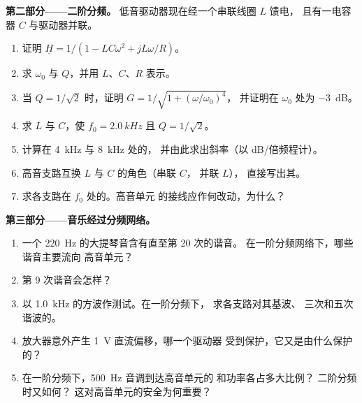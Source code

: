 \begin{problem}
\medskip
\noindent\textbf{第二部分——二阶分频。}
低音驱动器现在经一个串联线圈 $L$ 馈电，
且有一电容器 $C$ 与驱动器并联。
\begin{enumerate}[resume]
  \item 证明 $\underline H = 1/(1 - LC\omega^2 + jL\omega/R)$。
  \item 求 $\omega_0$ 与 $Q$，并用 $L$、$C$、$R$ 表示。
  \item 当 $Q = 1/\sqrt2$ 时，证明 $G = 1/\sqrt{1 + (\omega/\omega_0)^4}$，
        并证明在 $\omega_0$ 处为 \qty{-3}{dB}。
  \item 求 $L$ 与 $C$，使 $f_0 = \qty{2.0}{kHz}$ 且 $Q = 1/\sqrt2$。
  \item 计算在 \qty{4}{kHz} 与 \qty{8}{kHz} 处的，
        并由此求出斜率（以 dB/倍频程计）。
  \item 高音支路互换 $L$ 与 $C$ 的角色（串联 $C$，
        并联 $L$），
        直接写出其。
  \item 求各支路在 $f_0$ 处的。高音单元
        的接线应作何改动，为什么？
\end{enumerate}

\medskip
\noindent\textbf{第三部分——音乐经过分频网络。}
\begin{enumerate}[resume]
  \item 一个 \qty{220}{Hz} 的大提琴音含有直至第 20 次的谐音。
        在一阶分频网络下，哪些谐音主要流向
        高音单元？
  \item 第 9 次谐音会怎样？
  \item 以 \qty{1.0}{kHz} 的方波作测试。在一阶分频下，
        求各支路对其基波、
        三次和五次谐波的。
  \item 放大器意外产生 \qty{1}{V} 直流偏移，哪一个驱动器
        受到保护，它又是由什么保护的？
  \item 在一阶分频下，\qty{500}{Hz} 音调到达高音单元的
        和功率各占多大比例？
        二阶分频时又如何？
        这对高音单元的安全为何重要？
\end{enumerate}


\end{problem}
